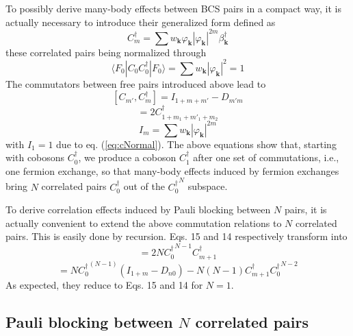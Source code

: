 \documentclass[aps,prb,preprint,groupedaddress,amsmath]{revtex4}
\newcommand{\vk}{\ensuremath{\mathbf{k}}}
\newcommand{\dg}{\ensuremath{\dagger}}
\begin{document}
To possibly derive many-body effects between BCS pairs in a compact way, it is actually necessary to introduce their generalized form defined as 
\begin{equation}\label{eq:C}
{C}_m^\dg=\sum{w_\vk\varphi_\vk|\varphi_\vk|}^{2m}\beta^\dg_\vk
\end{equation}
these correlated pairs being normalized through
\begin{equation}\label{eq:cNormal}
\langle{}F_0|{C_0}{C_0^\dg}|F_0{\rangle}=\sum{w_\vk}|\varphi_\vk|^{2}=1
\end{equation}
The commutators between free pairs introduced above lead to  
\begin{equation}\label{eq:ID}
[{C}_{m'},C^\dg_m]=I_{1+m+m'}-D_{m'm}
\end{equation}
\begin{equation}
[{D}_{m'_1,m_1},C^\dg_{m_2}]=2C^\dg_{1+m_1+m'_1+m_2}
\end{equation}
\begin{equation}
I_m=\sum{w_\vk|\varphi_\vk|^{2m}}
\end{equation}
with $I_1=1$ due to eq. (\ref{eq:cNormal}). The above equations show that, starting with cobosons $C^\dg_0$, we produce a coboson  $C^\dg_1$ after one set of commutations, i.e., one fermion exchange, so that many-body effects induced by fermion exchanges bring $N$ correlated pairs $C^\dg_0$ out of the  ${C^\dg_0}^N$ subspace.

  To derive correlation effects induced by Pauli blocking between $N$ pairs, it is actually convenient to extend the above commutation relations to $N$ correlated pairs. This is easily done by recursion. Eqs. 15 and 14 respectively transform into
\begin{equation}
[{D}_{m0},C^\dg_{0}{}^N]=2N{C^\dg_{0}}^{N-1}C^\dg_{m+1}
\end{equation}
\begin{equation}
[{C}_{m},C^\dg_{0}{}^N]=N{C^\dg_0}^{(N-1)}(I_{1+m}-D_{n0})-N(N-1)C^\dg_{m+1}{C^\dg_{0}}^{N-2}
\end{equation}
As expected, they reduce to Eqs. 15 and 14 for $N=1$.

\subsection{Pauli blocking between $N$ correlated pairs}
\end{document}

